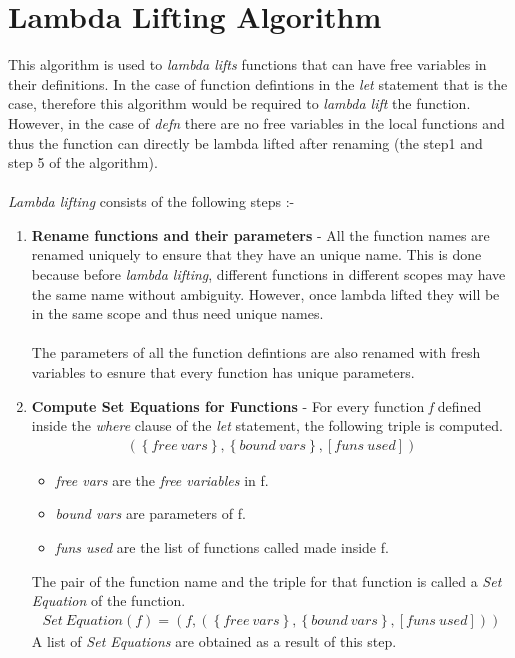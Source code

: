 \documentclass[11pt]{article}
\begin{document}
\section{Lambda Lifting Algorithm}\label{LamLiftAlg}
This algorithm is used to {\em lambda lifts} functions that can have free variables in their definitions. In the case of function defintions in the {\em let} statement that is the case, therefore this algorithm would be required to {\em lambda lift} the function. However, in the case of {\em defn} there are no free variables in the local functions and thus the function can directly be lambda lifted after renaming (the step1 and step 5 of the algorithm). 
~~\\~\\ 
{\em Lambda lifting} consists of the following steps :-
\begin{enumerate}
    \item {\bf Rename functions and their parameters} - 
    All the function names are renamed uniquely to ensure that they have an unique name. This is done because before {\em lambda lifting}, different functions in different scopes may have the same name without ambiguity. However, once lambda lifted they will be in the same scope and thus need unique names.
    ~~\\~~\\ 
    The parameters of all the function defintions are also renamed with fresh variables to esnure that every function has unique parameters.
    \item {\bf Compute Set Equations for Functions} -
    For every function {\em f} defined inside the {\em where} clause of the {\em let} statement, the following triple is computed.
    \begin{align*}
    (\left\{free~vars\right\},\left\{bound~vars\right\},[funs~used])
    \end{align*}
    \begin{itemize}
        \item {\em free vars}  are the {\em free variables} in f.
        \item {\em bound vars} are parameters of f. 
        \item {\em funs used}  are the list of functions called made inside f.
    \end{itemize}
    The pair of the function name and the triple for that function is called a {\em Set Equation} of the function.
    \begin{align*}
        Set~Equation (f) = (f,(\left\{free~vars\right\},\left\{bound~vars\right\},[funs~used]))
    \end{align*}
    A list of {\em Set Equations} are obtained as a result of this step. 
    

\end{enumerate}
\end{document}
